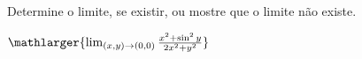 Determine o limite, se existir, ou mostre que o limite não existe.

\item$\mathlarger{\lim_{(x,y)\rightarrow(0,0)} \frac{x^2+\sin^2 y}{2x^2+y^2}}$
